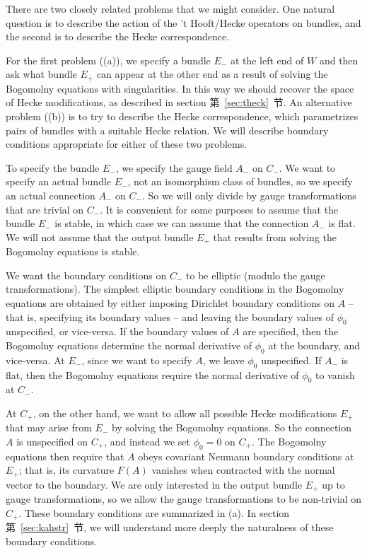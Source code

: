 There are two closely related problems that we might consider. One
natural question  is to describe the action of the 't Hooft/Hecke
operators on bundles, and the second is to describe the Hecke
correspondence.

For the first problem (\utampo(a)), we specify a bundle $E_-$ at
the left end of $W$ and then ask what bundle $E_+$ can appear at
the other end as a result of solving the Bogomolny equations with
singularities. In this way we should recover the space of Hecke
modifications, as described in section 第~\ref{sec:theck}~节.  An alternative
problem (\utampo(b)) is to try to describe the Hecke
correspondence, which parametrizes pairs of bundles with a
suitable Hecke relation. We will describe boundary conditions
appropriate for either of these two problems.

To specify the bundle $E_-$, we specify the gauge field $A_-$ on
$C_-$. We want to specify an actual bundle $E_-$, not an
isomorphism class of bundles, so we specify an actual connection
$A_-$ on $C_-$. So we will only divide by gauge transformations
that are trivial on $C_-$.  It is convenient for some purposes to
assume that the bundle $E_-$ is stable, in which case we can
assume that the connection $A_-$ is flat.  We will not assume that
the output bundle $E_+$ that results from solving the Bogomolny
equations is stable.

We want the boundary conditions on $C_-$ to be elliptic (modulo
the gauge transformations). The simplest elliptic boundary
conditions in the Bogomolny equations are obtained by either
imposing Dirichlet boundary conditions on $A$ -- that is,
specifying its boundary values -- and leaving the boundary values
of $\phi_0$ unspecified, or vice-versa. If the boundary values of
$A$ are specified, then the Bogomolny equations determine the
normal derivative of $\phi_0$ at the boundary, and vice-versa. At
$E_-$, since we want to specify $A$, we leave $\phi_0$
unspecified.  If $A_-$ is flat, then the Bogomolny equations
require the normal derivative of $\phi_0$ to vanish at $C_-$.

At $C_+$, on the other hand, we want to allow all possible Hecke
modifications $E_+$ that may arise from $E_-$ by solving the
Bogomolny equations.  So the connection $A$ is unspecified on
$C_+$, and instead we set $\phi_0=0$ on $C_+$.   The Bogomolny
equations then require that $A$ obeys covariant Neumann boundary
conditions at $E_+$; that is, its  curvature $F(A)$ vanishes when
contracted with the normal vector to the boundary. We are only
interested in the output bundle $E_+$ up to gauge transformations,
so we allow the gauge transformations to be non-trivial on $C_+$.
These boundary conditions are summarized in \utampo(a). In section
第~\ref{sec:kahstr}~节, we will understand more deeply the naturalness of these
boundary conditions.

